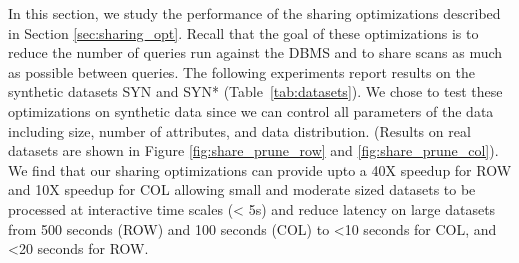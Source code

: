 In this section, we study the performance of the sharing optimizations described in Section \ref{sec:sharing_opt}.
Recall that the goal of these optimizations is to reduce the number of queries run against the DBMS and to share scans as much as possible between queries.
The following experiments report results on the synthetic datasets SYN and SYN* 
(Table~\ref{tab:datasets}).
We chose to test these optimizations on synthetic data since we can control all parameters of the data including size, number of attributes, and data distribution.
(Results on real datasets are shown in Figure \ref{fig:share_prune_row} and \ref{fig:share_prune_col}).
We find that our sharing optimizations can provide upto a 40X speedup for ROW and 10X speedup for COL allowing small and moderate sized datasets to be processed at interactive time scales (< 5s) and reduce latency on large datasets from 
500 seconds (ROW) and 100 seconds (COL) to <10 seconds for COL, and <20 seconds for ROW.



